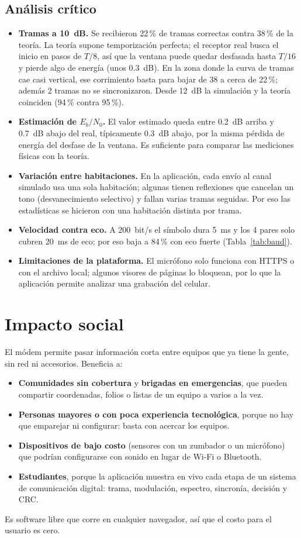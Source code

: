 \documentclass[10pt,twocolumn,letterpaper]{article}
\begin{document}
\subsection{Análisis crítico}
\begin{itemize}
\item \textbf{Tramas a 10~dB.} Se recibieron 22\,\% de tramas correctas contra 38\,\% de la teoría. La teoría supone temporización perfecta; el receptor real busca el inicio en pasos de $T/8$, así que la ventana puede quedar desfasada hasta $T/16$ y pierde algo de energía (unos 0.3~dB). En la zona donde la curva de tramas cae casi vertical, ese corrimiento basta para bajar de 38 a cerca de 22\,\%; además 2 tramas no se sincronizaron. Desde 12~dB la simulación y la teoría coinciden (94\,\% contra 95\,\%).
\item \textbf{Estimación de $E_b/N_0$.} El valor estimado queda entre 0.2~dB arriba y 0.7~dB abajo del real, típicamente 0.3~dB abajo, por la misma pérdida de energía del desfase de la ventana. Es suficiente para comparar las mediciones físicas con la teoría.
\item \textbf{Variación entre habitaciones.} En la aplicación, cada envío al canal simulado usa una sola habitación; algunas tienen reflexiones que cancelan un tono (desvanecimiento selectivo) y fallan varias tramas seguidas. Por eso las estadísticas se hicieron con una habitación distinta por trama.
\item \textbf{Velocidad contra eco.} A 200~bit/s el símbolo dura 5~ms y los 4 pares solo cubren 20~ms de eco; por eso baja a 84\,\% con eco fuerte (Tabla~\ref{tab:baud}).
\item \textbf{Limitaciones de la plataforma.} El micrófono solo funciona con HTTPS o con el archivo local; algunos visores de páginas lo bloquean, por lo que la aplicación permite analizar una grabación del celular.
\end{itemize}

\section{Impacto social}
El módem permite pasar información corta entre equipos que ya tiene la gente, sin red ni accesorios. Beneficia a:
\begin{itemize}
\item \textbf{Comunidades sin cobertura} y \textbf{brigadas en emergencias}, que pueden compartir coordenadas, folios o listas de un equipo a varios a la vez.
\item \textbf{Personas mayores o con poca experiencia tecnológica}, porque no hay que emparejar ni configurar: basta con acercar los equipos.
\item \textbf{Dispositivos de bajo costo} (sensores con un zumbador o un micrófono) que podrían configurarse con sonido en lugar de Wi-Fi o Bluetooth.
\item \textbf{Estudiantes}, porque la aplicación muestra en vivo cada etapa de un sistema de comunicación digital: trama, modulación, espectro, sincronía, decisión y CRC.
\end{itemize}
Es software libre que corre en cualquier navegador, así que el costo para el usuario es cero.
\end{document}
